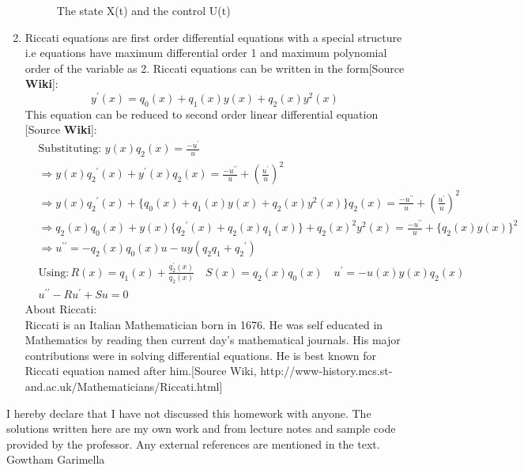 \begin{enumerate}
\begin{figure}[h!]
   \caption{The state X(t) and the control U(t)}
  \end{figure}
  \newpage
  
  
  \item Riccati equations are 	first order differential equations with a special structure i.e equations have maximum differential order 1 and maximum polynomial order of the 
  variable as 2. Riccati equations can be written in the form[Source \textbf{Wiki}]:
  \begin{equation*}
   y^{\prime}(x) = q_0(x) + q_1(x) y(x) + q_2(x) y^2 (x)
  \end{equation*}
  This equation can be reduced to second order linear differential equation [Source \textbf{Wiki}]:
  \begin{align*}
   &\text{Substituting: } y(x) q_2(x) = \frac{-u^{\prime}}{u}\\
   &\Rightarrow y(x) {q_2}^\prime(x) + y^\prime(x)q_2(x) = \frac{-u^{\prime\prime}}{u} + \left(\frac{u^{\prime}}{u}\right)^2\\
   &\Rightarrow y(x) {q_2}^\prime(x) + \{q_0(x) + q_1(x) y(x) + q_2(x) y^2(x)\} q_2(x) = \frac{-u^{\prime\prime}}{u} + \left(\frac{u^{\prime}}{u}\right)^2\\
   &\Rightarrow q_2(x) q_0(x) +  y(x) \{{q_2}^\prime(x)+ q_2(x) q_1(x)\} + q_2(x)^2 y^2(x)  = \frac{-u^{\prime\prime}}{u} + \{q_2(x) y(x)\}^2 \\
   &\Rightarrow u^{\prime\prime} = -q_2(x) q_0(x) u - uy(q_2 q_1 + {q_2}^\prime) \\
   & \text{Using}: R(x) = q_1(x) + \frac{q_2^\prime (x)}{q_2(x)} \quad S(x) = q_2(x) q_0(x) \quad u^\prime = -u(x)y(x)q_2(x)\\
   & u^{\prime\prime} -R u^{\prime} + S u = 0
  \end{align*}
  About Riccati:\\ 
  Riccati is an Italian Mathematician born in 1676. He was self educated in Mathematics by reading then current day's mathematical journals.  His major contributions were in solving differential equations. He is best known for Riccati equation named 
  after him.[Source Wiki, http://www-history.mcs.st-and.ac.uk/Mathematicians/Riccati.html]

\end{enumerate} 
\vfill
\begin{acknowledgements}
I hereby declare that I have not discussed this homework with anyone. The solutions written here are my own work and  from lecture notes and sample code provided by the professor. Any 
external references are mentioned in the text.
\flushright Gowtham Garimella
\end{acknowledgements}





